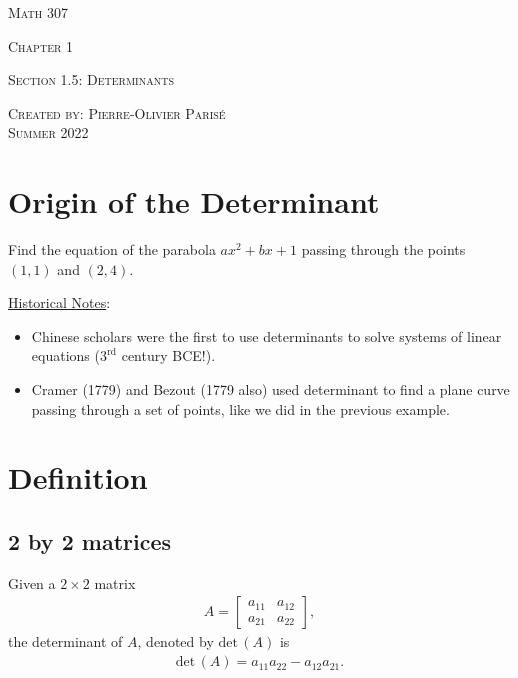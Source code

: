 \documentclass[12pt,a4paper]{article}
\newcounter{example}[section]
\begin{document}
\thispagestyle{empty}

\begin{center}
\vspace*{2.5cm}

{\Huge \textsc{Math 307}}

\vspace*{2cm}

{\LARGE \textsc{Chapter 1}} 

\vspace*{0.75cm}

\noindent\textsc{Section 1.5: Determinants}

\vspace*{0.75cm}

\tableofcontents

\vfill

\noindent \textsc{Created by: Pierre-Olivier Paris{\'e}} \\
\textsc{Summer 2022}
\end{center}

\newpage

\section{Origin of the Determinant}

\begin{example}
Find the equation of the parabola $ax^2 + bx + 1$ passing through the points $(1, 1)$ and $(2, 4)$.
\end{example}

\vfill

\noindent\underline{Historical Notes}:
	\begin{itemize}
	\item Chinese scholars were the first to use determinants to solve systems of linear equations ($3^{\text{rd}}$ century BCE!).
	\item Cramer (1779) and Bezout (1779 also) used determinant to find a plane curve passing through a set of points, like we did in the previous example.
	\end{itemize}

\newpage

\section{Definition}

	\subsection{2 by 2 matrices}
	Given a $2 \times 2$ matrix 
		\begin{align*}
		A = \begin{bmatrix}
		a_{11} & a_{12} \\ a_{21} & a_{22}
		\end{bmatrix},
		\end{align*}
	the determinant of $A$, denoted by $\mathrm{det} \, (A)$ is
		\begin{align*}
		\mathrm{det}\, (A) = a_{11} a_{22} - a_{12} a_{21} .
		\end{align*}
		
\end{document}
